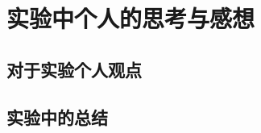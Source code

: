 \documentclass{ctexart}
\begin{document}






\section{实验中个人的思考与感想}
  \subsection{对于实验个人观点}

  \subsection{实验中的总结}
\end{document}
